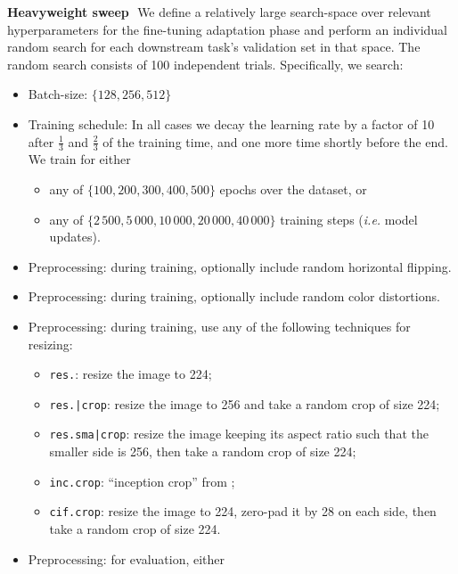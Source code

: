 \documentclass{article}
\renewcommand{\paragraph}[1]{{\bf #1}\,\,}
\begin{document}
\paragraph{Heavyweight sweep}
We define a relatively large search-space over relevant hyperparameters for the fine-tuning adaptation phase and perform an individual random search for each downstream task's validation set in that space.
The random search consists of 100 independent trials.
Specifically, we search:
\begin{itemize}
    \item Batch-size: $\{128,\allowbreak 256,\allowbreak 512\}$
    \item Training schedule: In all cases we decay the learning rate by a factor of 10 after $\frac{1}{3}$ and $\frac{2}{3}$ of the training time, and one more time shortly before the end. We train for either
    \begin{itemize}
        \item any of $\{100,\allowbreak 200,\allowbreak 300,\allowbreak 400,\allowbreak 500\}$ epochs over the dataset, or
        \item any of $\{2\,500,\allowbreak 5\,000,\allowbreak 10\,000,\allowbreak 20\,000,\allowbreak 40\,000\}$ training steps (\emph{i.e.} model updates).
    \end{itemize}
    \item Preprocessing: during training, optionally include random horizontal flipping.
    \item Preprocessing: during training, optionally include random color distortions.
    \item Preprocessing: during training, use any of the following techniques for resizing:
    \begin{itemize}
        \item \texttt{res.}: resize the image to 224;
        \item \texttt{res.|crop}: resize the image to 256 and take a random crop of size 224;
        \item \texttt{res.sma|crop}: resize the image keeping its aspect ratio such that the smaller side is 256, then take a random crop of size 224;
        \item \texttt{inc.crop}: ``inception crop'' from \cite{szegedy2015going};
        \item \texttt{cif.crop}: resize the image to 224, zero-pad it by 28 on each side, then take a random crop of size 224.
    \end{itemize}
    \item Preprocessing: for evaluation, either

\end{itemize}
\end{document}
